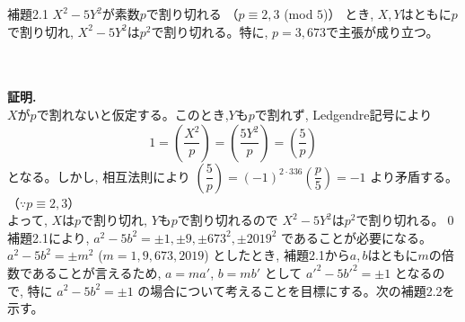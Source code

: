 \documentclass[twocolumn]{jsarticle}
\newcommand{\thm}{\begin{itembox}[l]}
\newcommand{\enthm}{\end{itembox}\\}
\begin{document}
\thm{補題2.1}
$X^2-5Y^2$が素数$p$で割り切れる （$p\equiv 2,3$ (mod $5$)） とき, $X,Y$はともに$p$で割り切れ, $X^2-5Y^2$は$p^2$で割り切れる。特に, $p=3,673$で主張が成り立つ。
\enthm
\\
{\bf 証明.}\\
$X$が$p$で割れないと仮定する。このとき,$Y$も$p$で割れず, Ledgendre記号により
\[1=\left(\dfrac{X^2}{p}\right)=\left(\dfrac{5Y^2}{p}\right)=\left(\dfrac{5}{p}\right)\]
となる。しかし, 相互法則により $\left(\dfrac{5}{p}\right)=(-1)^{2\cdot 336}\left(\dfrac{p}{5}\right)=-1$ より矛盾する。（$\because p\equiv 2,3$）\\
よって, $X$は$p$で割り切れ, $Y$も$p$で割り切れるので $X^2-5Y^2$は$p^2$で割り切れる。\qed
\\

補題2.1により, $a^2-5b^2=\pm 1, \pm 9, \pm 673^2, \pm 2019^2$ であることが必要になる。$a^2-5b^2=\pm m^2$ ($m=1,9,673,2019$) としたとき, 補題2.1から$a,b$はともに$m$の倍数であることが言えるため, $a=ma'$, $b=mb'$ として $a'^2-5b'^2=\pm 1$ となるので, 特に $a^2-5b^2=\pm 1$ の場合について考えることを目標にする。次の補題2.2を示す。
\end{document}
